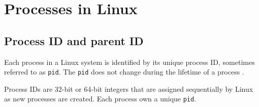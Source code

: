 \documentclass[a4paper]{article}
\begin{document}






\newpage
\tableofcontents
\newpage



\section{Processes in Linux}

\subsection{Process ID and parent ID}

\begin{definition}[pid]
Each process in a Linux system is identified by its unique process ID, sometimes
referred to as \textup{\texttt{pid}}. The \textup{\texttt{pid}} does not change during the lifetime of a process \cite{bookmitchell}.
\end{definition}
Process IDs are 32-bit or 64-bit integers that are assigned sequentially by Linux as new processes are created. Each process own a unique \texttt{pid}.
\end{document}
